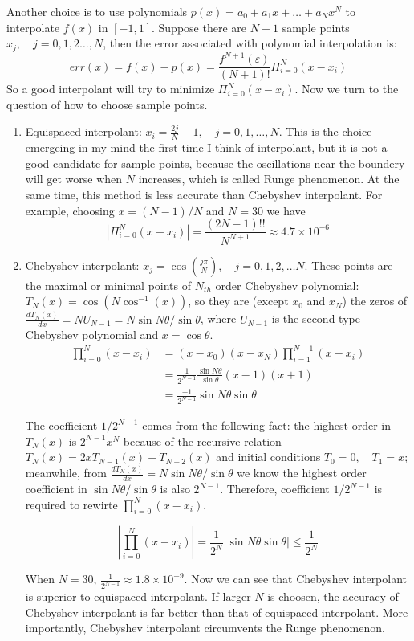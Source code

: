  Another choice is to use polynomials $p(x)=a_{0}+a_{1}x+\dots+a_{N}x^{N}$ to interpolate $f(x)$
 in $[-1,1]$. Suppose there are $N+1$ sample points $x_{j},\quad j=0,1,2 \dots ,N$, then
 the error associated with polynomial interpolation is:
 \[
  err(x)=f(x)-p(x)=\frac{f^{N+1}(\varepsilon)}{(N+1)!}\Pi_{i=0}^{N}(x-x_{i})
 \]
 So a good interpolant will try to minimize $\Pi_{i=0}^{N}(x-x_{i})$.
 Now we turn to the question of how to choose sample points.

 \begin{enumerate}
  \item Equispaced interpolant: $x_{i}=\frac{2j}{N}-1,\quad j=0,1,\dots, N $. This is the choice
  emergeing in my mind the first time I think of interpolant, but it is not a good candidate for
  sample points, because the oscillations near the boundery will get worse
  when $N$ increases, which is called Runge phenomenon. At the same time, this method is less accurate
  than Chebyshev interpolant.
  For example, choosing $x=(N-1)/N$ and $N=30$ we have
  \[
   |\Pi_{i=0}^{N}(x-x_{i})|= \frac{(2N-1)!!}{N^{N+1}}\approx 4.7\times 10^{-6}
  \]


  \item Chebyshev interpolant: $x_{j}=\cos(\frac{j\pi}{N}), \quad j=0,1,2,\dots N$.
  These points are the maximal or minimal points of $N_{th}$ order Chebyshev polynomial:
  $T_{N}(x)=\cos(N\cos^{-1}(x))$, so they are (except $x_0$ and $x_N$)
  the zeros of $\frac{dT_{N}(x)}{dx}=NU_{N-1}=N\sin N\theta/\sin\theta$, where $U_{N-1}$
  is the second type Chebyshev polynomial and $x=\cos\theta$.
  \begin{align*}
   \prod_{i=0}^{N}(x-x_{i}) &=(x-x_0)(x-x_N)\prod_{i=1}^{N-1}(x-x_{i})\\
   &=\frac{1}{2^{N-1}}\frac{\sin N\theta}{\sin\theta}(x-1)(x+1)\\
   &=\frac{-1}{2^{N-1}}\sin N\theta \sin\theta
  \end{align*}

  The coefficient $1/2^{N-1}$ comes from the following fact: the highest order
  in $T_{N}(x)$ is $2^{N-1}x^{N}$ because of the recursive relation
  $T_{N}(x)=2xT_{N-1}(x)-T_{N-2}(x)$ and initial conditions $T_{0}=0,\quad T_{1}=x$;
  meanwhile, from $\frac{dT_{N}(x)}{dx}=N\sin N\theta/\sin\theta$ we know the highest order
  coefficient in  $\sin N\theta/\sin\theta$ is also $2^{N-1}$. Therefore, coefficient
  $1/2^{N-1}$ is required to rewirte $\prod_{i=0}^{N}(x-x_{i})$.

  \[
   |\prod_{i=0}^{N}(x-x_{i})|=\frac{1}{2^{N}} |\sin N\theta \sin\theta| \leq \frac{1}{2^{N}}
  \]

  When $N=30$,  $\frac{1}{2^{N-1}}\approx 1.8\times 10^{-9}$. Now we can see that Chebyshev interpolant
  is superior to equispaced interpolant. If larger $N$ is choosen, the accuracy of Chebyshev interpolant
  is far better than that of equispaced interpolant. More importantly,
  Chebyshev interpolant circumvents the
  Runge phenomenon.


\end{enumerate}


